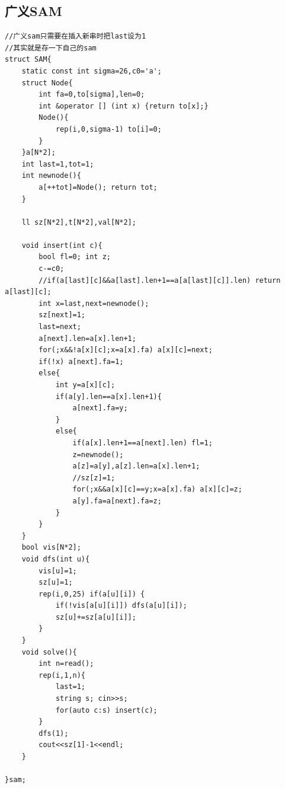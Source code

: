 \documentclass[a4]{ctexart}
\begin{document}
\subsection{广义SAM}
\begin{lstlisting}
//广义sam只需要在插入新串时把last设为1
//其实就是存一下自己的sam
struct SAM{
    static const int sigma=26,c0='a';
    struct Node{
        int fa=0,to[sigma],len=0;
        int &operator [] (int x) {return to[x];}
        Node(){
            rep(i,0,sigma-1) to[i]=0;
        }
    }a[N*2];
    int last=1,tot=1;
    int newnode(){
        a[++tot]=Node(); return tot;
    }

    ll sz[N*2],t[N*2],val[N*2];

    void insert(int c){
        bool fl=0; int z;
        c-=c0;
        //if(a[last][c]&&a[last].len+1==a[a[last][c]].len) return a[last][c]; 
        int x=last,next=newnode();
        sz[next]=1;
        last=next;
        a[next].len=a[x].len+1;
        for(;x&&!a[x][c];x=a[x].fa) a[x][c]=next;
        if(!x) a[next].fa=1;
        else{
            int y=a[x][c];
            if(a[y].len==a[x].len+1){
                a[next].fa=y;   
            }
            else{
                if(a[x].len+1==a[next].len) fl=1;
                z=newnode();
                a[z]=a[y],a[z].len=a[x].len+1;
                //sz[z]=1;
                for(;x&&a[x][c]==y;x=a[x].fa) a[x][c]=z;
                a[y].fa=a[next].fa=z;
            }
        }
    }
    bool vis[N*2];
    void dfs(int u){
        vis[u]=1;
        sz[u]=1;
        rep(i,0,25) if(a[u][i]) {
            if(!vis[a[u][i]]) dfs(a[u][i]);
            sz[u]+=sz[a[u][i]];
        }
    }
    void solve(){
        int n=read();
        rep(i,1,n){
            last=1;
            string s; cin>>s;
            for(auto c:s) insert(c);
        }
        dfs(1);
        cout<<sz[1]-1<<endl;
    }

}sam;
\end{lstlisting}
\end{document}
